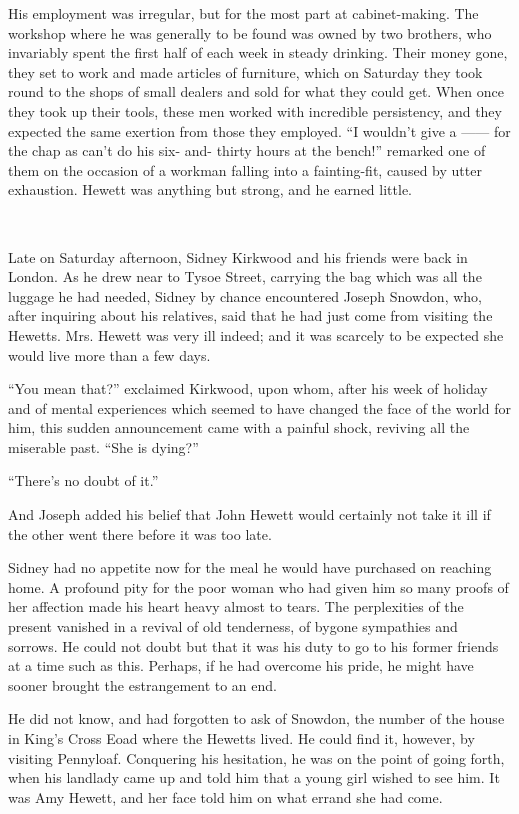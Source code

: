 His employment was irregular, but for the most part at cabinet-making.
The workshop where he was generally to be found was owned by two
brothers, who invariably spent the first half of each week in steady
drinking. Their money gone, they set to work and made articles of
furniture, which on Saturday they took round to the shops of small
dealers {}and sold for what they could get. When once they took up their
tools, these men worked with incredible persistency, and they expected
the same exertion from those they employed. ``I wouldn't give {a
{{------}}} for the chap as can't do his six- and- thirty hours at the
bench!'' remarked one of them on the occasion of a workman falling into
a fainting-fit, caused by utter exhaustion. Hewett was anything but
strong, and he earned little.

~

Late on Saturday afternoon, Sidney Kirkwood and his friends were back in
London. As he drew near to Tysoe Street, carrying the bag which was all
the luggage he had needed, Sidney by chance encountered Joseph Snowdon,
who, after inquiring about his relatives, said that he had just come
from visiting the Hewetts. Mrs. Hewett was very ill indeed; and it was
scarcely to be expected she would live more than a few days.

``You mean that?'' exclaimed Kirkwood, upon whom, after his week of
holiday and of mental experiences which seemed to have {}changed the
face of the world for him, this sudden announcement came with a painful
shock, reviving all the miserable past. ``She is dying?''

``There's no doubt of it.''

And Joseph added his belief that John Hewett would certainly not take it
ill if the other went there before it was too late.

Sidney had no appetite now for the meal he would have purchased on
reaching home. A profound pity for the poor woman who had given him so
many proofs of her affection made his heart heavy almost to tears. The
perplexities of the present vanished in a revival of old tenderness, of
bygone sympathies and sorrows. He could not doubt but that it was his
duty to go to his former friends at a time such as this. Perhaps, if he
had overcome his pride, he might have sooner brought the estrangement to
an end.

He did not know, and had forgotten to ask of Snowdon, the number of the
house in King's Cross Eoad where the Hewetts lived. He could find it,
however, by visiting {}Pennyloaf. Conquering his hesitation, he was on
the point of going forth, when his landlady came up and told him that a
young girl wished to see him. It was Amy Hewett, and her face told him
on what errand she had come.

